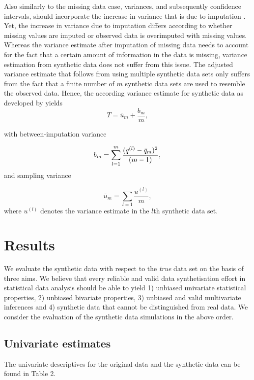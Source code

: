 \documentclass[psych,article,submit,moreauthors,pdftex]{mdpi}
\begin{document}
Also similarly to the missing data case, variances, and subsequently
confidence intervals, should incorporate the increase in variance that
is due to imputation
\citep{reiter_partially_inference_2003, drechsler_synthetic_2011}. Yet,
the increase in variance due to imputation differs according to whether
missing values are imputed or observed data is overimputed with missing
values. Whereas the variance estimate after imputation of missing data
needs to account for the fact that a certain amount of information in
the data is missing, variance estimation from synthetic data does not
suffer from this issue. The adjusted variance estimate that follows from
using multiple synthetic data sets only suffers from the fact that a
finite number of \(m\) synthetic data sets are used to resemble the
observed data. Hence, the according variance estimate for synthetic data
as developed by \citet{reiter_partially_inference_2003} yields \[
T = \bar{u}_m + \frac{b_m}{m},
\]

with between-imputation variance

\[
b_m = \sum_{l = 1}^m \frac{(q^{(l)} - \bar{q}_m)^2}{(m - 1)}, \\
\] and sampling variance

\[
\bar{u}_m = \sum_{l = 1} \frac{u^{(l)}}{m},
\] where \(u^{(l)}\) denotes the variance estimate in the \(l\)th
synthetic data set.

\hypertarget{results}{%
\section{Results}\label{results}}

We evaluate the synthetic data with respect to the \emph{true} data set
on the basis of three aims. We believe that every reliable and valid
data synthetisation effort in statistical data analysis should be able
to yield 1) unbiased univariate statistical properties, 2) unbiased
bivariate properties, 3) unbiased and valid multivariate inferences and
4) synthetic data that cannot be distinguished from real data. We
consider the evaluation of the synthetic data simulations in the above
order.

\hypertarget{univariate-estimates}{%
\subsection{Univariate estimates}\label{univariate-estimates}}

The univariate descriptives for the original data and the synthetic data
can be found in Table 2.
\end{document}
